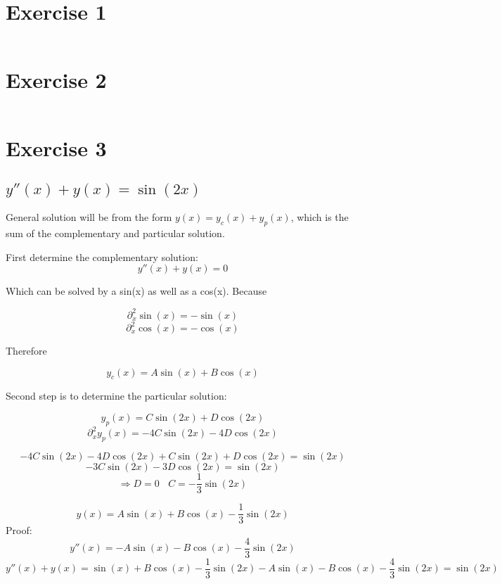 \documentclass[11pt]{article}
\begin{document}
\date{\today}

\section{Exercise 1}

\begin{lstlisting}

\end{lstlisting}

\section{Exercise 2}

\begin{lstlisting}

\end{lstlisting}

\section{Exercise 3}

\subsection{$ y''(x) + y(x) = \sin(2x) $}

General solution will be from the form $y(x) = y_c(x) + y_p(x)$, which is the sum of the complementary and particular solution.

First determine the complementary solution: 
\[ y''(x) + y(x) = 0 \]

Which can be solved by a sin(x) as well as a cos(x). Because 

\[  \partial^2_x \sin(x) = -\sin(x)  \]
\[  \partial^2_x \cos(x) = -\cos(x)  \]

Therefore

\[ y_c(x) = A\sin(x) + B\cos(x) \]

Second step is to determine the particular solution:

\[ y_p(x) = C\sin(2x) + D\cos(2x) \]
\[ \partial^2_x y_p(x) = -4C\sin(2x) -4D\cos(2x) \]

\[ -4C\sin(2x) -4D\cos(2x) + C\sin(2x) + D\cos(2x) = \sin(2x) \]
\[ -3C\sin(2x) - 3D\cos(2x) = \sin(2x) \]
\[ \Rightarrow D = 0 ~~~~ C = -\frac{1}{3}\sin(2x) \]

\[\boxed{ y(x) = A\sin(x) + B\cos(x) -\frac{1}{3}\sin(2x) }\]
Proof:
\[ y''(x) = -A\sin(x) - B\cos(x) -\frac{4}{3} \sin(2x)\]
\[ y''(x) + y(x) = \sin(x) + B\cos(x) -\frac{1}{3}\sin(2x) -A\sin(x) - B\cos(x) -\frac{4}{3} \sin(2x) = \sin(2x) \]
\end{document}

